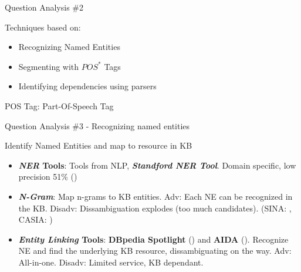 \documentclass{beamer}
\begin{document}
\begin{frame}{Question Analysis \#2}
  \begin{card}
    Techniques based on:
    \begin{itemize}
      \item Recognizing Named Entities
      \item Segmenting with $POS^{*}$ Tags
      \item Identifying dependencies using parsers
    \end{itemize}
  \end{card}
  \vspace{8em}
  POS Tag: Part-Of-Speech Tag
\end{frame}


\begin{frame}{Question Analysis \#3 - Recognizing named entities}
  \begin{card}
    Identify Named Entities and map to resource in KB
    \begin{itemize}
      \item \textbf{\textit{NER} Tools}: Tools from NLP, \textbf{\textit{Standford NER Tool}}. Domain specific, low precision 51\% (\cite{he2014a})
      \item \textbf{\textit{N-Gram}}: Map n-grams to KB entities. Adv: Each NE can be recognized in the KB. Disadv: Dissambiguation explodes (too much candidates). (SINA: \cite{shekarpour2015a}, CASIA: \cite{he2014a})
      \item \textbf{\textit{Entity Linking} Tools}: \textbf{DBpedia Spotlight} (\cite{daiber2013a}) and \textbf{AIDA} (\cite{yosef2011a}). Recognize NE and find the underlying KB resource, dissambiguating on the way. Adv: All-in-one. Disadv: Limited service, KB dependant.
    \end{itemize}
  \end{card}
\end{frame}
\end{document}

